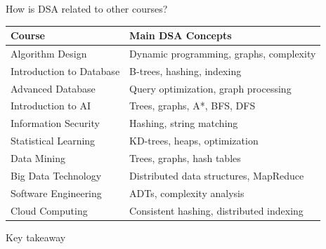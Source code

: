 \documentclass[aspectratio=169]{beamer}
\begin{document}
\begin{frame}{How is DSA related to other courses?}
  \begin{tabular}{lp{8cm}}
    \toprule
    \textbf{Course} & \textbf{Main DSA Concepts} \\
    \midrule
    Algorithm Design & Dynamic programming, graphs, complexity \\
    Introduction to Database & B-trees, hashing, indexing \\
    Advanced Database & Query optimization, graph processing \\
    Introduction to AI & Trees, graphs, A*, BFS, DFS \\
    Information Security & Hashing, string matching \\
    Statistical Learning & KD-trees, heaps, optimization \\
    Data Mining & Trees, graphs, hash tables \\
    Big Data Technology & Distributed data structures, MapReduce \\
    Software Engineering & ADTs, complexity analysis \\
    Cloud Computing & Consistent hashing, distributed indexing \\
    \bottomrule
  \end{tabular}
\end{frame}

\begin{frame}{Key takeaway}
\end{frame}

\begin{frame}{}
  {\Huge
  }
\end{frame}
\end{document}
